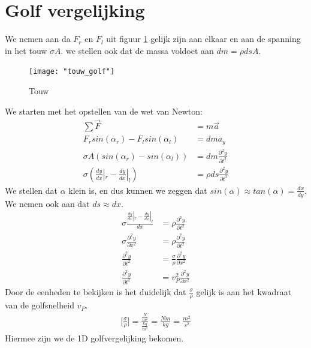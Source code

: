 \documentclass[a4paper,kul]{kulakarticle} %
\begin{document}
\section{Golf vergelijking}
We nemen aan da $F_r$ en $F_l$ uit figuur \ref{fig:touwgolf} gelijk zijn aan elkaar en aan de spanning in het touw $\sigma A$. we stellen ook dat de massa voldoet aan $dm=\rho dsA$.\\
\begin{figure}[htbp]
	\centering
	\texttt{[image: "touw\_golf"]}
	\caption[Touw]{Touw}
	\label{fig:touwgolf}
\end{figure}
We starten met het opstellen van de wet van Newton:
\begin{align*}
	\sum\vec{F}&=m\vec{a}\\
	F_rsin(\alpha_r) - F_lsin(\alpha_l) & = dma_y\\
	\sigma A(sin(\alpha_r)-sin(\alpha_l)) & = dm\frac{\partial^2y}{\partial t^2}\\
	\sigma(\frac{dy}{dx}|_r-\frac{dy}{dx}|_l) & = \rho ds \frac{\partial^2y}{\partial t^2}
\end{align*}
We stellen dat $\alpha$ klein is, en dus kunnen we zeggen dat $sin(\alpha)\approx tan(\alpha) = \frac{dx}{dy}$. We nemen ook aan dat $ds \approx dx$.
\begin{align*}
	\sigma\frac{\frac{dy}{dx}|_r-\frac{dy}{dx}|_l}{dx} & = \rho \frac{\partial^2y}{\partial t^2}\\
	\sigma\frac{\partial^2y}{\partial x^2} & = \rho \frac{\partial^2y}{\partial t^2}\\
	\frac{\partial^2y}{\partial t^2} & = \frac{\sigma}{\rho}\frac{\partial^2y}{\partial x^2}\\
	\frac{\partial^2y}{\partial t^2} & = v_P^2\frac{\partial^2y}{\partial x^2}
\end{align*}
Door de eenheden te bekijken is het duidelijk dat $\frac{\sigma}{\rho}$ gelijk is aan het kwadraat van de golfsnelheid $v_P$.
\begin{align*}
	\bigg[\frac{\sigma}{\rho}\bigg]=\frac{\frac{N}{m^2}}{\frac{kg}{m^3}}=\frac{Nm}{kg}=\frac{m^2}{s^2}
\end{align*}
Hiermee zijn we de 1D golfvergelijking bekomen.
\newpage
\end{document}
